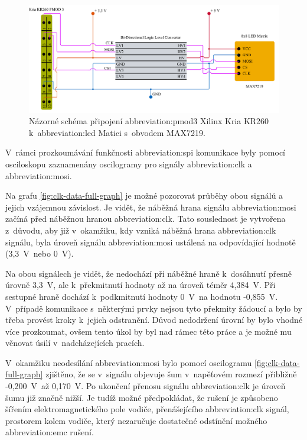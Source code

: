 \documentclass[a4paper, twoside, 11pt]{article}
\newcommand{\fbar}{\FloatBarrier}
\begin{document}
	\begin{figure}[htbp!]
		\centering
		\includegraphics[width=1\textwidth]{src/pdf/spi-test-connection.pdf}
		\caption{Názorné schéma připojení \gls{abbreviation:pmod}3 Xilinx Kria KR260 k~\gls{abbreviation:led} Matici s~obvodem MAX7219.}
		\label{fig:spi-test-connection}
	\end{figure}



	\fbar
	V~rámci prozkoumávání funkčnosti \gls{abbreviation:spi} komunikace byly pomocí osciloskopu zaznamenány oscilogramy pro signály \textcolor{ctublue}{\gls{abbreviation:clk}} a \textcolor{ctured}{\gls{abbreviation:mosi}}.\par
	Na grafu \ref{fig:clk-data-full-graph} je možné pozorovat průběhy obou signálů a jejich vzájemnou závislost. Je vidět, že náběžná hrana signálu \gls{abbreviation:mosi} začíná před náběžnou hranou \gls{abbreviation:clk}. Tato souslednost je vytvořena z~důvodu, aby již v~okamžiku, kdy vzniká náběžná hrana \textcolor{ctublue}{\gls{abbreviation:clk}} signálu, byla úroveň signálu \textcolor{ctured}{\gls{abbreviation:mosi}} ustálená na odpovídající hodnotě (3,3~V~nebo 0~V).\par
	Na obou signálech je vidět, že nedochází při náběžné hraně k~dosáhnutí přesně úrovně 3,3~V, ale k~překmitnutí hodnoty až na úroveň téměr 4,384~V. Při sestupné hraně dochází k~podkmitnutí hodnoty 0~V~na hodnotu -0,855~V. V~případě komunikace s~některými prvky nejsou tyto překmity žádoucí a bylo by třeba provést kroky k~jejich odstranění. Důvod nedodržení úrovní by bylo vhodné více prozkoumat, ovšem tento úkol by byl nad rámec této práce a je možné mu věnovat úsilí v~nadcházejících pracích.\par
	V~okamžiku neodesílání \textcolor{ctured}{\gls{abbreviation:mosi}} bylo pomocí oscilogramu \ref{fig:clk-data-full-graph} zjištěno, že se v~signálu objevuje šum v~napěťovém rozmezí přibližně -0,200~V~až 0,170~V. Po ukončení přenosu signálu \textcolor{ctublue}{\gls{abbreviation:clk}} je úroveň šumu již značně nižší. Je tudíž možné předpokládat, že rušení je způsobeno šířením elektromagnetického pole vodiče, přenášejícího \textcolor{ctublue}{\gls{abbreviation:clk}} signál, prostorem kolem vodiče, který nezaručuje dostatečné odstínění možného \gls{abbreviation:emc} rušení.
\end{document}
